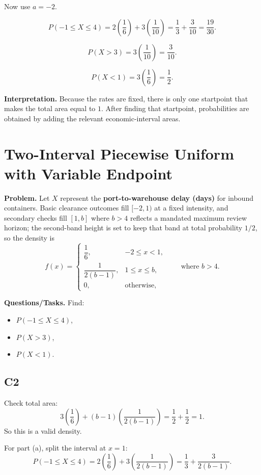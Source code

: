 Now use $a=-2$.

\[
P(-1\le X\le 4)=2\left(\frac{1}{6}\right)+3\left(\frac{1}{10}\right)
=\frac{1}{3}+\frac{3}{10}
=\frac{19}{30}.
\]

\[
P(X>3)=3\left(\frac{1}{10}\right)=\frac{3}{10}.
\]

\[
P(X<1)=3\left(\frac{1}{6}\right)=\frac{1}{2}.
\]


\textbf{Interpretation.}
Because the rates are fixed, there is only one startpoint that makes the total area equal to $1$. After finding that startpoint, probabilities are obtained by adding the relevant economic-interval areas.

\section{Two-Interval Piecewise Uniform with Variable Endpoint}

\textbf{Problem.}
Let $X$ represent the \textbf{port-to-warehouse delay (days)} for inbound containers. Basic clearance outcomes fill $[-2,1)$ at a fixed intensity, and secondary checks fill $[1,b]$ where $b>4$ reflects a mandated maximum review horizon; the second-band height is set to keep that band at total probability $1/2$, so the density is
\[
f(x)=
\begin{cases}
	\dfrac{1}{6}, & -2\le x<1,\\[4pt]
	\dfrac{1}{2(b-1)}, & 1\le x\le b,\\[4pt]
	0, & \text{otherwise,}
\end{cases}
\qquad \text{where } b>4.
\]

\textbf{Questions/Tasks.}
Find:
\begin{itemize}
	\item[(a)] $P(-1\le X\le 4)$,
	\item[(b)] $P(X>3)$,
	\item[(c)] $P(X<1)$.
\end{itemize}

\subsection*{C2}
Check total area:
\[
3\left(\frac{1}{6}\right)+(b-1)\left(\frac{1}{2(b-1)}\right)
=\frac{1}{2}+\frac{1}{2}=1.
\]
So this is a valid density.

For part (a), split the interval at $x=1$:
\[
P(-1\le X\le 4)
=2\left(\frac{1}{6}\right)+3\left(\frac{1}{2(b-1)}\right)
=\frac{1}{3}+\frac{3}{2(b-1)}.
\]

